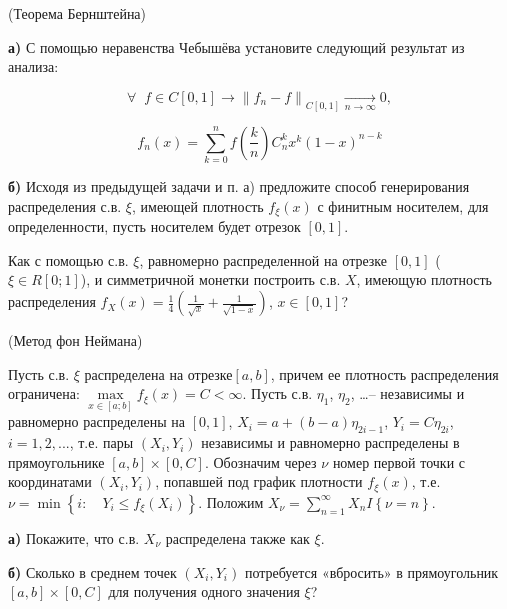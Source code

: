 \begin{problem}
(Теорема Бернштейна) 

\textbf{а)} С помощью неравенства Чебышёва установите следующий результат из анализа: 

\[
\forall \; \; f\in C\left[0,1\right]\to \left\| f_{n} -f\right\| _{C\left[0,1\right]} \xrightarrow[{n\to \infty }]{} 0,
\] 

\[
f_{n} \left(x\right)=\sum_{k=0}^{n}f\left(\frac{k}{n} \right) C_{n}^{k} x^{k} \left(1-x\right)^{n-k} 
\]

\textbf{б)} Исходя из предыдущей задачи и п. а) предложите способ генерирования распределения с.в. $\xi $, имеющей плотность $f_{\xi } \left(x\right)$ с финитным носителем, для определенности, пусть носителем будет отрезок $\left[0,1\right]$.
\end{problem}

\begin{problem}
Как с помощью с.в. $\xi $, равномерно распределенной на отрезке $\left[0,1\right]$ ($\xi \in R\left[0;1\right]$), и симметричной монетки построить с.в. $X$, имеющую плотность распределения $f_{X} (x)=\frac{1}{4} \left(\frac{1}{\sqrt{x} } +\frac{1}{\sqrt{1-x} } \right)$, $x\in \left[0,1\right]$?
\end{problem}

\begin{problem}
(Метод фон Неймана) 

Пусть с.в. $\xi $ распределена на отрезке$\left[a,b\right]$, причем ее плотность распределения ограничена: $\mathop{\max }\limits_{x\in \left[a;b\right]} f_{\xi } (x)=C<\infty $. Пусть с.в. $\eta _{1} $, $\eta _{2} $, \dots  -- независимы и равномерно распределены на $\left[0,1\right]$, $X_{i} =a+\left(b-a\right)\eta _{2i-1} $, $Y_{i} =C\eta _{2i} $, $i=1,2,...$, т.е. пары $\left(X_{i} ,Y_{i} \right)$ независимы и равномерно распределены в прямоугольнике $\left[a,b\right]\times \left[0,C\right]$. Обозначим через $\nu $ номер первой точки с координатами $\left(X_{i} ,Y_{i} \right)$, попавшей под график плотности $f_{\xi } (x)$, т.е. $\nu =\min \left\{i:\quad Y_{i} \le f_{\xi } (X_{i} )\right\}$. Положим $X_{\nu } =\sum _{n=1}^{\infty }X_{n} I\left\{\nu =n\right\} $.

\textbf{а)} Покажите, что с.в. $X_{\nu } $ распределена также как $\xi $.

\textbf{б)} Сколько в среднем точек $\left(X_{i} ,Y_{i} \right)$ потребуется «вбросить» в прямоугольник $\left[a,b\right]\times \left[0,C\right]$ для получения одного значения $\xi $?
\end{problem}


